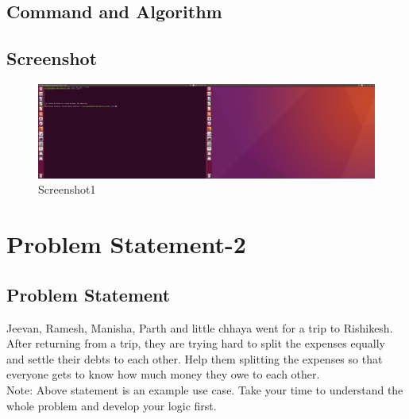 \documentclass[12pt]{article}
\begin{document}
\

\subsection{Command and Algorithm}





\subsection{Screenshot}


\begin{figure}[h!]
\begin{center}
\includegraphics[scale=0.12]{pa1.png}
\caption{Screenshot1}
\end{center}
\end{figure}










\newpage



\section{Problem Statement-2}

\subsection{Problem Statement}
Jeevan, Ramesh, Manisha, Parth and little chhaya went for a trip to Rishikesh. After returning from a trip, they are trying hard to split the expenses equally and settle their debts to each other. Help them splitting the expenses so that everyone gets to know how much money they owe to each other. \\
Note: Above statement is an example use case. Take your time to understand the whole problem and develop your logic first.\\
\end{document}
